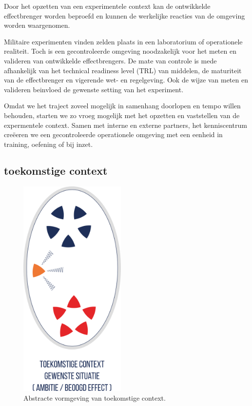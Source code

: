 \documentclass[
]{book}
\begin{document}
Door het opzetten van een experimentele context kan de ontwikkelde effectbrenger worden beproefd en kunnen de werkelijke reacties van de omgeving worden waargenomen.

Militaire experimenten vinden zelden plaats in een laboratorium of operationele realiteit. Toch is een gecontroleerde omgeving noodzakelijk voor het meten en valideren van ontwikkelde effectbrengers. De mate van controle is mede afhankelijk van het technical readiness level (TRL) van middelen, de maturiteit van de effectbrenger en vigerende wet- en regelgeving. Ook de wijze van meten en valideren beinvloed de gewenste setting van het experiment.

Omdat we het traject zoveel mogelijk in samenhang doorlopen en tempo willen behouden, starten we zo vroeg mogelijk met het opzetten en vaststellen van de expermentele context. Samen met interne en externe partners, het kenniscentrum creëeren we een gecontroleerde operationele omgeving met een eenheid in training, oefening of bij inzet.

\hypertarget{toekomstige-context}{%
\subsection{toekomstige context}\label{toekomstige-context}}

\begin{figure}
\includegraphics[width=150pt]{data/images/20210324-MDI-eieren-beweging-3} \caption{Abstracte vormgeving van toekomstige context.}\label{fig:eieren-in-beweging-3}
\end{figure}
\end{document}
